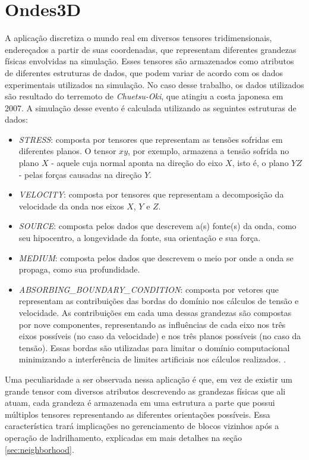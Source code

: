 \documentclass[cic,tc]{iiufrgs}
\begin{document}
\section{Ondes3D}
A aplicação discretiza o mundo real em diversos tensores tridimensionais, endereçados a partir de suas coordenadas, que representam diferentes grandezas físicas envolvidas
na simulação. Esses tensores são armazenados como atributos de diferentes estruturas de dados, que podem variar de acordo com os dados experimentais utilizados na simulação. No caso
desse trabalho, os dados utilizados são resultado do terremoto de \textit{Chuetsu-Oki}, que atingiu a costa japonesa em 2007. A simulação desse evento é calculada utilizando as
seguintes estruturas de dados:

\begin{itemize}
\item{\textit{STRESS}:} composta por tensores que representam as tensões sofridas em diferentes planos. O tensor $xy$, por exemplo, armazena a tensão sofrida no plano
  $X$ - aquele cuja normal aponta na direção do eixo $X$, isto é, o plano $YZ$ - pelas forças causadas na direção $Y$.
\item{\textit{VELOCITY}:} composta por tensores que representam a decomposição da velocidade da onda nos eixos $X$, $Y$ e $Z$.
\item{\textit{SOURCE}:} composta pelos dados que descrevem a(s) fonte(s) da onda, como seu hipocentro, a longevidade da fonte, sua orientação e sua força.
\item{\textit{MEDIUM}:} composta pelos dados que descrevem o meio por onde a onda se propaga, como sua profundidade.
\item{\textit{ABSORBING\_BOUNDARY\_CONDITION}:} composta por vetores que representam as contribuições das bordas do domínio nos cálculos
  de tensão e velocidade. As contribuições em cada uma dessas grandezas são compostas por nove componentes, representando as influências de
  cada eixo nos três eixos possíveis (no caso da velocidade) e nos três planos possíveis (no caso da tensão). Essas bordas são utilizadas
  para limitar o domínio computacional minimizando a interferência de limites artificiais nos cálculos realizados. \cite{ABCarticle}. 
\end{itemize}

Uma peculiaridade a ser observada nessa aplicação é que, em vez de existir um grande tensor com diversos atributos descrevendo as grandezas físicas que ali atuam, cada grandeza
é armazenada em uma estrutura a parte que possui múltiplos tensores representando as diferentes orientações possíveis. Essa característica trará implicações no gerenciamento de blocos
vizinhos após a operação de ladrilhamento, explicadas em mais detalhes na seção \ref{sec:neighborhood}.
\end{document}
